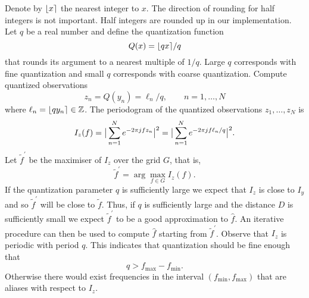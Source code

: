 \documentclass[10pt,twocolumn,twoside]{IEEEtran}
\begin{document}
Denote by ${\left\lfloor x \right\rceil}$ the nearest integer to $x$.  The direction of rounding for half integers is not important.  Half integers are rounded up in our implementation.  Let $q$ be a real number and define the quantization function
\[
Q(x) = {\left\lfloor qx \right\rceil}/q
\]
that rounds its argument to a nearest multiple of $1/q$.  Large $q$ corresponds with fine quantization and small $q$ corresponds with coarse quantization.  Compute quantized observations
\[
z_n = Q(y_n) =  \ell_n/q, \qquad n = 1,\dots,N
\]
where $\ell_n = {\left\lfloor qy_n \right\rceil} \in {\mathbb Z}$.  The periodogram of the quantized observations $z_1,\dots,z_N$ is
\begin{align*}
I_z(f) = \big\vert  \sum_{n=1}^N e^{ -2\pi j f z_n}  \big\vert^2 = \big\vert  \sum_{n=1}^N e^{ -2\pi j f \ell_n/q}  \big\vert^2.
\end{align*}
Let $\widetilde{f}^\prime$ be the maximiser of $I_z$ over the grid $G$, that is,
\[
\widetilde{f}^\prime = \arg\max_{f \in G} I_z(f).
\]
If the quantization parameter $q$ is sufficiently large we expect that $I_z$ is close to $I_y$ and so $\widetilde{f}^\prime$ will be close to $\widetilde{f}$.  Thus, if $q$ is sufficiently large and the distance $D$ is sufficiently small we expect $\widetilde{f}^\prime$ to be a good approximation to $\hat{f}$.  An iterative procedure %
can then be used to compute $\hat{f}$ starting from $\widetilde{f}^\prime$.  
Observe that $I_z$ is periodic with period $q$.  This indicates that quantization should be fine enough that 
\begin{equation}\label{eq:boundaliasingP}
q > f_{\text{max}} - f_{\text{min}}.
\end{equation}
Otherwise there would exist frequencies in the interval $(f_{\text{min}}, f_{\text{max}})$ that are aliases with respect to $I_z$.  %

\newcommand{\ellmin}{\ell_{\text{min}}}
\newcommand{\ellmax}{\ell_{\text{max}}}
\end{document}
